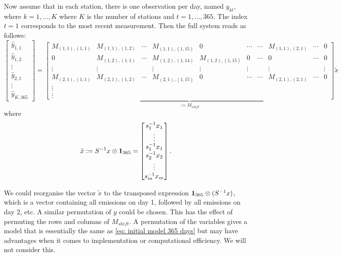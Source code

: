 \documentclass{article}
\begin{document}
Now assume that in each station, there is one observation per day, named $y_{kt}$, where $k = 1,\dots,K$ where $K$ is the number of stations and $t = 1,\dots,365$. The index $t=1$ corresponds to the most recent measurement. Then the full system reads as follows:
\begin{equation}
    \label{eq: initial model 365 days}
\begin{bmatrix}
    \hat{y}_{1,1} \\
    \hat{y}_{1,2} \\
    \vdots \\
    \hat{y}_{2,1} \\ 
    \vdots \\
    \hat{y}_{K,365}
\end{bmatrix}
=
\underbrace{
\begin{bmatrix}
    M_{(1,1), (1,1)} & M_{(1,1), (1,2)} & \cdots & M_{(1,1),(1,15)} & 0 & \cdots & \cdots & M_{(1,1), (2,1)} & \cdots & 0 \\
    0 & M_{(1,2), (1,1)} & \cdots & M_{(1,2), (1,14)} & M_{(1,2), (1,15)} & 0 & \cdots & 0 & \cdots & 0 \\
    \vdots & \vdots & & \vdots & \vdots & \vdots & & \vdots & & \vdots \\
    M_{(2,1), (1,1)} & M_{(2,1), (1,2)} & \cdots & M_{(2,1),(1,15)} & 0 & \cdots & \cdots & M_{(2,1), (2,1)} & \cdots & 0 \\
    \vdots \\
    \vdots
\end{bmatrix}
}_{ := M_{shift}}
\tilde{x}
\end{equation}
where 
$$
\tilde{x} := S^{-1} x \otimes \vb{1}_{365}
=
\begin{bmatrix}
    s_1^{-1} x_1 \\
    \vdots \\
    s_1^{-1} x_1 \\ 
    s_2^{-1} x_2 \\
    \vdots \\ 
    s_m^{-1} x_m
\end{bmatrix}
.$$

We could reorganise the vector $\tilde{x}$ to the transposed expression $\vb{1}_{365} \otimes (S^{-1} x)$, which is a vector containing all emissions on day 1, followed by all emissions on day 2, etc. A similar permutation of $y$ could be chosen. This has the effect of permuting the rows and columns of $M_{shift}$. A permutation of the variables gives a model that is essentially the same as \cref{eq: initial model 365 days} but may have advantages when it comes to implementation or computational efficiency. We will not consider this.
\end{document}
